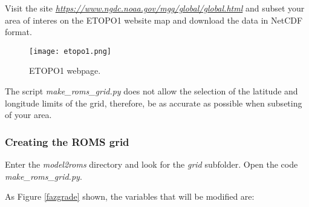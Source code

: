 \noindent Visit the site \textcolor{bleu_cite}{\href{https://www.ngdc.noaa.gov/mgg/global/global.html}{\textit{https://www.ngdc.noaa.gov/mgg/global/global.html}}} 
and subset your area of interes on the ETOPO1 website map and download the data in NetCDF format.

\bigskip  
   
\begin{figure}[H]
    \centering
    \texttt{[image: etopo1.png]}
    \caption{ETOPO1 webpage.}
    \label{etopo1}
\end{figure}
\bigskip


\bigskip

\begin{tcolorbox}[enhanced,
    grow to left by   = 0cm,
    grow to right by  = 0cm,
    enlarge top by    = 0cm,
    enlarge bottom by = 0cm,
    tcbox raise base,
    boxrule           = 1.0pt,
    left              = 18mm,
    colframe          = red!50!black,coltext=red!25!black,colback=red!10!white,
    overlay           = {\begin{tcbclipinterior}\fill[red!75!blue!50!white] (frame.south west)
      rectangle node[text=white,font=\sffamily\bfseries\footnotesize,rotate=0] {WARNING} ([xshift=18mm]frame.north west);\end{tcbclipinterior}}]
The script \textit{make\_roms\_grid.py} does not allow the selection of the latitude and longitude limits of the grid, therefore, be as accurate as possible when subseting of your area.

\end{tcolorbox}
\bigskip

\subsubsection{Creating the ROMS grid}

\noindent Enter the \textit{model2roms} directory and look for the \textit{grid} subfolder. Open the code \textit{make\_roms\_grid.py}.
\bigskip

\bigskip

\noindent As Figure \textcolor{bleu_cite}{\ref{fazgrade}} shown, the variables that will be modified are:
\bigskip

